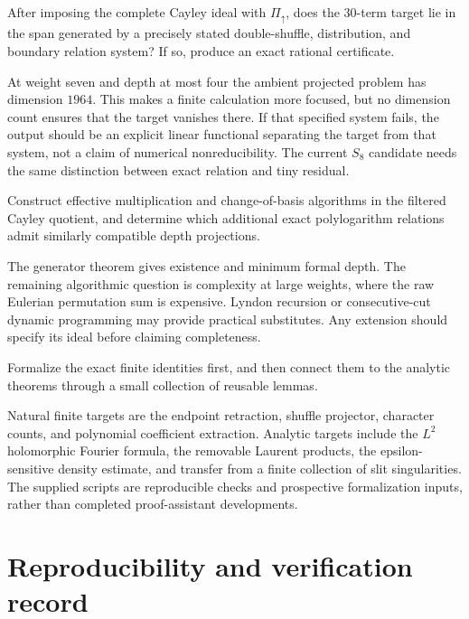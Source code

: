 \begin{question}
After imposing the complete Cayley ideal with
$\Pi_{\uparrow}$, does the 30-term target lie in the span generated
by a precisely stated double-shuffle, distribution, and boundary
relation system? If so, produce an exact rational certificate.
\end{question}
At weight seven and depth at most four the ambient projected problem
has dimension $1964$. This makes a finite calculation more focused,
but no dimension count ensures that the target vanishes there.
If that specified system fails, the output should be an explicit
linear functional separating the target from that system, not a
claim of numerical nonreducibility. The current $S_8$ candidate needs
the same distinction between exact relation and tiny residual.

\begin{question}
Construct effective multiplication and change-of-basis algorithms in
the filtered Cayley quotient, and determine which additional exact
polylogarithm relations admit similarly compatible depth projections.
\end{question}
The generator theorem gives existence and minimum formal depth. The
remaining algorithmic question is complexity at large weights, where
the raw Eulerian permutation sum is expensive. Lyndon recursion or
consecutive-cut dynamic programming may provide practical substitutes.
Any extension should specify its ideal before claiming completeness.

\begin{question}
Formalize the exact finite identities first, and then connect them to
the analytic theorems through a small collection of reusable lemmas.
\end{question}
Natural finite targets are the endpoint retraction, shuffle projector,
character counts, and polynomial coefficient extraction. Analytic
targets include the $L^2$ holomorphic Fourier formula, the removable
Laurent products, the epsilon-sensitive density estimate, and transfer
from a finite collection of slit singularities. The supplied scripts
are reproducible checks and prospective formalization inputs, rather
than completed proof-assistant developments.

\section{Reproducibility and verification record}
\label{sec:verification}

